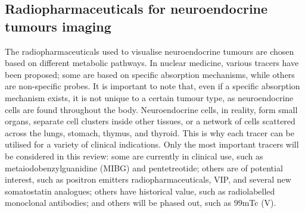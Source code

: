 \documentclass{article}
\begin{document}
\begin{multicols}{2}
\section{Radiopharmaceuticals for neuroendocrine tumours imaging }
The radiopharmaceuticals used to visualise neuroendocrine tumours are chosen based on different metabolic pathways. In nuclear medicine, various tracers have been proposed; some are based on specific absorption mechanisms, while others are non-specific probes. It is important to note that, even if a specific absorption mechanism exists, it is not unique to a certain tumour type, as neuroendocrine cells are found throughout the body. Neuroendocrine cells, in reality, form small organs, separate cell clusters inside other tissues, or a network of cells scattered across the lungs, stomach, thymus, and thyroid\cite{estrozi2011neuroendocrine}. This is why each tracer can be utilised for a variety of clinical indications. Only the most important tracers will be considered in this review: some are currently in clinical use, such as metaiodobenzylguanidine (MIBG) and pentetreotide; others are of potential interest, such as positron emitters radiopharmaceuticals, VIP, and several new somatostatin analogues; others have historical value, such as radiolabelled monoclonal antibodies; and others will be phased out, such as 99mTc (V)\cite{ahmed2020gastrointestinal}. 



\end{multicols}
\end{document}
